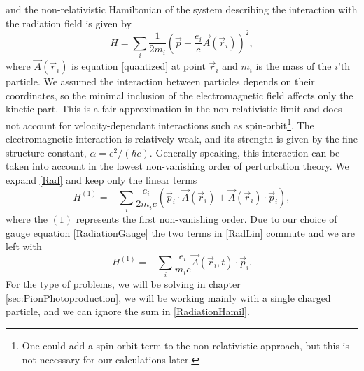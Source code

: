 and the non-relativistic Hamiltonian of the system describing the interaction with the radiation field is given by
\begin{equation} \label{Rad}
	H = \sum_i \frac{1}{2m_i}\left( \vec{p}-\frac{e_i}{c}\vec{A}(\vec{r}_i)\right)^2,
\end{equation}
where $\vec{A}(\vec{r}_i)$ is equation \eqref{quantized} at point $\vec{r}_i$ and $m_i$ is the mass of the $i$'th particle. We assumed the interaction between particles depends on their coordinates, so the minimal inclusion of the electromagnetic field affects only the kinetic part. This is a fair approximation in the non-relativistic limit and does not account for velocity-dependant interactions such as spin-orbit\footnote{One could add a spin-orbit term to the non-relativistic approach, but this is not necessary for our calculations later.}. 
The electromagnetic interaction is relatively weak, and its strength is given by the fine structure constant, $\alpha = e^2/(\hbar c)$. Generally speaking, this interaction can be taken into account in the lowest non-vanishing order of perturbation theory. We expand \eqref{Rad} and keep only the linear terms
\begin{equation} \label{RadLin}
	H^{(1)} = -\sum_i \frac{e_i}{2m_i c} (\vec{p}_i\cdot \vec{A}(\vec{r}_i)+\vec{A}(\vec{r}_i)\cdot \vec{p}_i),
\end{equation}
where the $(1)$ represents the first non-vanishing order. Due to our choice of gauge equation \eqref{RadiationGauge} the two terms in \eqref{RadLin} commute and we are left with
\begin{equation} \label{RadiationHamil}
	H^{(1)} = - \sum_i \frac{e_i}{m_i c} \vec{A}(\vec{r}_i,t)\cdot\vec{p}_i.
\end{equation}
For the type of problems, we will be solving in chapter \ref{sec:PionPhotoproduction}, we will be working mainly with a single charged particle, and we can ignore the sum in \eqref{RadiationHamil}.
